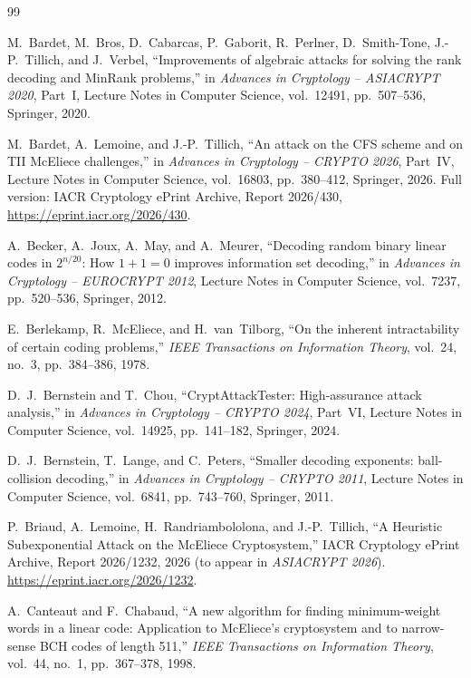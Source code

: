 \documentclass[11pt,a4paper]{article}
\theoremstyle{definition}
\theoremstyle{remark}
\begin{document}
\begin{thebibliography}{99}

M.~Bardet, M.~Bros, D.~Cabarcas, P.~Gaborit, R.~Perlner, D.~Smith-Tone, J.-P.~Tillich, and J.~Verbel,
``Improvements of algebraic attacks for solving the rank decoding and MinRank problems,'' in \emph{Advances in Cryptology -- ASIACRYPT 2020}, Part~I, Lecture Notes in Computer Science, vol.~12491, pp.~507--536, Springer, 2020.

M.~Bardet, A.~Lemoine, and J.-P.~Tillich,
``An attack on the CFS scheme and on TII McEliece challenges,'' in \emph{Advances in Cryptology -- CRYPTO 2026}, Part~IV, Lecture Notes in Computer Science, vol.~16803, pp.~380--412, Springer, 2026. Full version: IACR Cryptology ePrint Archive, Report 2026/430, \url{https://eprint.iacr.org/2026/430}.

A.~Becker, A.~Joux, A.~May, and A.~Meurer,
``Decoding random binary linear codes in $2^{n/20}$: How $1 + 1 = 0$ improves information set decoding,'' in \emph{Advances in Cryptology -- EUROCRYPT 2012}, Lecture Notes in Computer Science, vol.~7237, pp.~520--536, Springer, 2012.

E.~Berlekamp, R.~McEliece, and H.~van~Tilborg,
``On the inherent intractability of certain coding problems,'' \emph{IEEE Transactions on Information Theory}, vol.~24, no.~3, pp.~384--386, 1978.

D.~J.~Bernstein and T.~Chou,
``CryptAttackTester: High-assurance attack analysis,'' in \emph{Advances in Cryptology -- CRYPTO 2024}, Part~VI, Lecture Notes in Computer Science, vol.~14925, pp.~141--182, Springer, 2024.

D.~J.~Bernstein, T.~Lange, and C.~Peters,
``Smaller decoding exponents: ball-collision decoding,'' in \emph{Advances in Cryptology -- CRYPTO 2011}, Lecture Notes in Computer Science, vol.~6841, pp.~743--760, Springer, 2011.

P.~Briaud, A.~Lemoine, H.~Randriambololona, and J.-P.~Tillich,
``A Heuristic Subexponential Attack on the McEliece Cryptosystem,'' IACR Cryptology ePrint Archive, Report 2026/1232, 2026 (to appear in \emph{ASIACRYPT 2026}). \url{https://eprint.iacr.org/2026/1232}.

A.~Canteaut and F.~Chabaud,
``A new algorithm for finding minimum-weight words in a linear code: Application to McEliece's cryptosystem and to narrow-sense BCH codes of length 511,'' \emph{IEEE Transactions on Information Theory}, vol.~44, no.~1, pp.~367--378, 1998.


\end{thebibliography}
\end{document}

